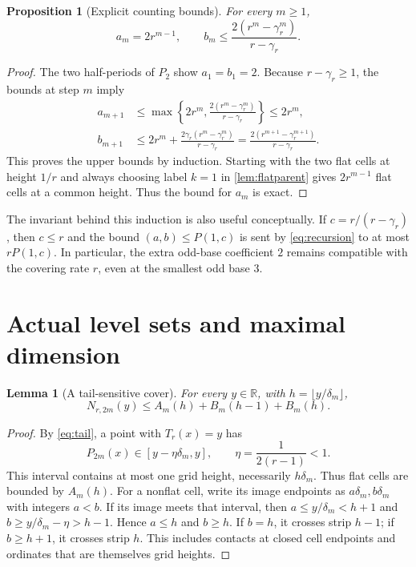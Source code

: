 \documentclass[11pt]{article}
\newtheorem{proposition}[theorem]{Proposition}
\newtheorem{lemma}[theorem]{Lemma}
\theoremstyle{definition}
\theoremstyle{remark}
\newcommand{\R}{\mathbb R}
\begin{document}
\begin{proposition}[Explicit counting bounds]\label{prop:counts}
For every $m\ge1$,
\begin{equation}\label{eq:abexplicit}
 a_m=2r^{m-1},\qquad
 b_m\le\frac{2(r^m-\gamma_r^m)}{r-\gamma_r}.
\end{equation}
\end{proposition}
\begin{proof}
The two half-periods of $P_2$ show $a_1=b_1=2$.
Because $r-\gamma_r\ge1$, the bounds at step $m$ imply
\begin{align*}
 a_{m+1}&\le\max\left\{2r^m,
 \frac{2(r^m-\gamma_r^m)}{r-\gamma_r}\right\}\le2r^m,\\
 b_{m+1}&\le2r^m+\frac{2\gamma_r(r^m-\gamma_r^m)}{r-\gamma_r}
 =\frac{2(r^{m+1}-\gamma_r^{m+1})}{r-\gamma_r}.
\end{align*}
This proves the upper bounds by induction. Starting with the two flat
cells at height $1/r$ and always choosing label $k=1$ in
\cref{lem:flatparent} gives $2r^{m-1}$ flat cells at a common height.
Thus the bound for $a_m$ is exact.
\end{proof}

The invariant behind this induction is also useful conceptually. If
$c=r/(r-\gamma_r)$, then $c\le r$ and the bound
$(a,b)\le P(1,c)$ is sent by \cref{eq:recursion} to at most
$rP(1,c)$. In particular, the extra odd-base coefficient $2$ remains
compatible with the covering rate $r$, even at the smallest odd base $3$.

\section{Actual level sets and maximal dimension}\label{sec:upper}
\begin{lemma}[A tail-sensitive cover]\label{lem:cover}
For every $y\in\R$, with $h=\lfloor y/\delta_m\rfloor$,
\begin{equation}\label{eq:coverAB}
 N_{r,2m}(y)\le A_m(h)+B_m(h-1)+B_m(h).
\end{equation}
\end{lemma}
\begin{proof}
By \cref{eq:tail}, a point with $T_r(x)=y$ has
\[
 P_{2m}(x)\in[y-\eta\delta_m,y],\qquad
 \eta=\frac1{2(r-1)}<1.
\]
This interval contains at most one grid height, necessarily $h\delta_m$.
Thus flat cells are bounded by $A_m(h)$.
For a nonflat cell, write its image endpoints as $a\delta_m,b\delta_m$
with integers $a<b$. If its image meets that interval, then
$a\le y/\delta_m<h+1$ and $b\ge y/\delta_m-\eta>h-1$.
Hence $a\le h$ and $b\ge h$. If $b=h$, it crosses strip $h-1$; if
$b\ge h+1$, it crosses strip $h$. This includes contacts at closed cell
endpoints and ordinates that are themselves grid heights.
\end{proof}
\end{document}
